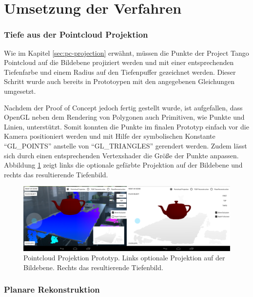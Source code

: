 \section{Umsetzung der Verfahren} \label{sec:method-implementation}

\subsubsection*{Tiefe aus der Pointcloud Projektion}

Wie im Kapitel \ref{sec:pc-projection} erwähnt, müssen die Punkte der Project Tango Pointcloud auf die Bildebene projiziert werden und mit einer entsprechenden Tiefenfarbe und einem Radius auf den Tiefenpuffer gezeichnet werden. Dieser Schritt wurde auch bereits in Prototoypen mit den angegebenen Gleichungen umgesetzt. 

Nachdem der Proof of Concept jedoch fertig gestellt wurde, ist aufgefallen, dass OpenGL neben dem Rendering von Polygonen auch Primitiven, wie Punkte und Linien, unterstützt. Somit konnten die Punkte im finalen Prototyp einfach vor die Kamera positioniert werden und mit Hilfe der symbolischen Konstante \enquote{GL\_POINTS} anstelle von \enquote{GL\_TRIANGLES} gerendert werden. Zudem lässt sich durch einen entsprechenden Vertexshader die Größe der Punkte anpassen. Abbildung \ref{fig:pc-demo} zeigt links die optionale gefärbte Projektion auf der Bildebene und rechts das resultierende Tiefenbild.

\begin{figure}[h]
  \centering
	\includegraphics[width=1.0\textwidth]{content/images/implementation/pc-demo.png} 
  \caption{Pointcloud Projektion Prototyp. Links optionale Projektion auf der Bildebene. Rechts das resultierende Tiefenbild.}
  \label{fig:pc-demo}
\end{figure}



\subsubsection*{Planare Rekonstruktion}


